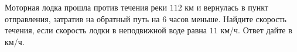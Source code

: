 \begin{ex}
	\begin{condition}
		Моторная лодка прошла против течения реки \( 112 \) км и вернулась в пункт отправления, затратив на обратный путь на \( 6 \) часов меньше. Найдите скорость течения, если скорость лодки в неподвижной воде равна \( 11 \) км/ч. Ответ дайте в км/ч.
	\end{condition}
\end{ex}